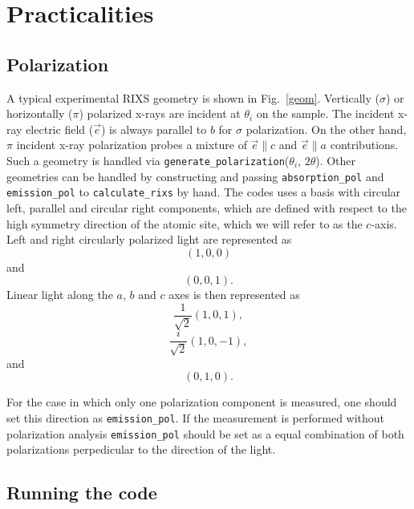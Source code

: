 \documentclass[aps,onecolumn, notitlepage, longbibliography]{revtex4-1}
\begin{document}
\section{Practicalities}

\subsection{Polarization}

A typical experimental RIXS geometry is shown in Fig.~\ref{geom}. Vertically ($\sigma$) or horizontally ($\pi$) polarized x-rays are incident at $\theta_i$ on the sample. The incident x-ray electric field ($\vec{e}$) is always parallel to $b$ for $\sigma$ polarization. On the other hand, $\pi$ incident x-ray polarization probes a mixture of $\vec{e} \parallel c$ and $\vec{e}\parallel a$ contributions.  Such a geometry is handled via \texttt{generate\_polarization}($\theta_i$, $2\theta$). Other geometries can be handled by constructing and passing \texttt{absorption\_pol} and \texttt{emission\_pol} to 
\texttt{calculate\_rixs} by hand. The codes uses a basis with circular left, parallel and circular right components, which are defined with respect to the high symmetry direction of the atomic site, which we will refer to as the $c$-axis. Left and right circularly polarized light are represented as
\begin{equation}
(1, 0, 0)
\end{equation}
and
\begin{equation}
(0, 0, 1).
\end{equation}
Linear light along the $a$, $b$ and $c$ axes is then represented as
\begin{equation}
\frac{1}{\sqrt{2}}(1, 0, 1), 
\end{equation}
\begin{equation}
\frac{i}{\sqrt{2}}(1, 0, -1),
\end{equation}
and
\begin{equation}
(0, 1, 0).
\end{equation}

For the case in which only one polarization component is measured, one should set this direction as \texttt{emission\_pol}. If the measurement is performed without polarization analysis \texttt{emission\_pol} should be set as a equal combination of both polarizations perpedicular to the direction of the light. 

\subsection{Running the code}
\end{document}
